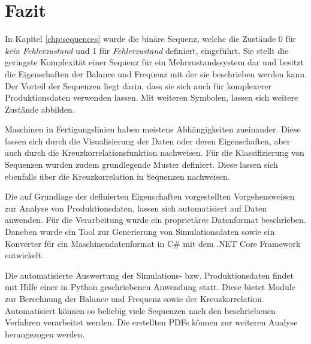 \chapter{Fazit}
\label{chp:conclusion}
In Kapitel \ref{chp:sequences} wurde die binäre Sequenz, welche die Zustände 0 für \textit{kein Fehlerzustand} und 1 für \textit{Fehlerzustand} definiert, eingeführt. Sie stellt die geringste Komplexität einer Sequenz für ein Mehrzustandssystem dar und besitzt die Eigenschaften der Balance und Frequenz mit der sie beschrieben werden kann. Der Vorteil der Sequenzen liegt darin, dass sie sich auch für komplexerer Produktionsdaten verwenden lassen. Mit weiteren Symbolen, lassen sich weitere Zustände abbilden.

Maschinen in Fertigungslinien haben meistens Abhängigkeiten zueinander. Diese lassen sich durch die Visualisierung der Daten oder deren Eigenschaften, aber auch durch die Kreuzkorrelationsfunktion nachweisen. Für die Klassifizierung von Sequenzen wurden zudem grundlegende Muster definiert. Diese lassen sich ebenfalls über die Kreuzkorrelation in Sequenzen nachweisen.

Die auf Grundlage der definierten Eigenschaften vorgestellten Vorgehensweisen zur Analyse von Produktionsdaten, lassen sich automatisiert auf Daten anwenden. Für die Verarbeitung wurde ein proprietäres Datenformat beschrieben. Daneben wurde ein Tool zur Generierung von Simulationsdaten sowie ein Konverter für ein Maschinendatenformat in C\# mit dem .NET Core Framework entwickelt.

Die automatisierte Auswertung der Simulations- bzw. Produktionsdaten findet mit Hilfe einer in Python geschriebenen Anwendung statt. Diese bietet Module zur Berechnung der Balance und Frequenz sowie der Kreuzkorrelation. Automatisiert können so beliebig viele Sequenzen nach den beschriebenen Verfahren verarbeitet werden. Die erstellten PDFs können zur weiteren Analyse herangezogen werden.